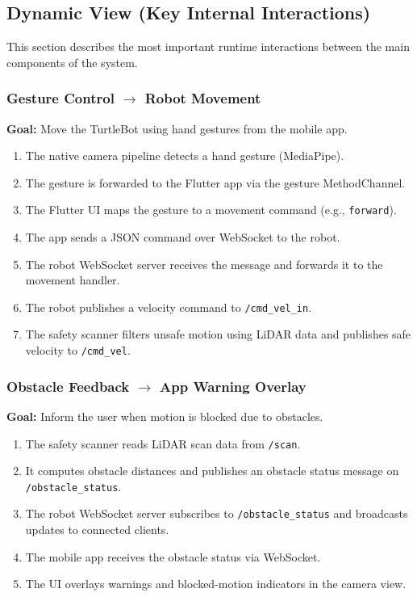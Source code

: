 \documentclass[11pt,a4paper]{article}
\begin{document}
\subsection{Dynamic View (Key Internal Interactions)}
This section describes the most important runtime interactions between the main components of the system.

\subsubsection{Gesture Control $\rightarrow$ Robot Movement}
\textbf{Goal:} Move the TurtleBot using hand gestures from the mobile app.

\begin{enumerate}[leftmargin=1.5cm]
	\item The native camera pipeline detects a hand gesture (MediaPipe).
	\item The gesture is forwarded to the Flutter app via the gesture MethodChannel.
	\item The Flutter UI maps the gesture to a movement command (e.g., \texttt{forward}).
	\item The app sends a JSON command over WebSocket to the robot.
	\item The robot WebSocket server receives the message and forwards it to the movement handler.
	\item The robot publishes a velocity command to \texttt{/cmd\_vel\_in}.
	\item The safety scanner filters unsafe motion using LiDAR data and publishes safe velocity to \texttt{/cmd\_vel}.
\end{enumerate}

\subsubsection{Obstacle Feedback $\rightarrow$ App Warning Overlay}
\textbf{Goal:} Inform the user when motion is blocked due to obstacles.

\begin{enumerate}[leftmargin=1.5cm]
	\item The safety scanner reads LiDAR scan data from \texttt{/scan}.
	\item It computes obstacle distances and publishes an obstacle status message on \texttt{/obstacle\_status}.
	\item The robot WebSocket server subscribes to \texttt{/obstacle\_status} and broadcasts updates to connected clients.
	\item The mobile app receives the obstacle status via WebSocket.
	\item The UI overlays warnings and blocked-motion indicators in the camera view.
\end{enumerate}
\end{document}
